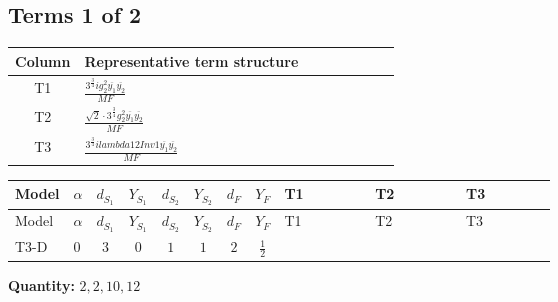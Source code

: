 \documentclass[8pt]{article}
\begin{document}
\begin{landscape}
\subsection*{Terms 1 of 2}
\begin{center}
\begin{tabular}{@{}c >{\raggedright\arraybackslash}p{0.82\linewidth}@{}}
\toprule
Column & Representative term structure \\
\midrule
T1 & \(\displaystyle \frac{3^{\frac{3}{4}} i g_{2}^{2} \overline{y_{1}} \overline{y_{2}}}{MF}\) \\
\midrule
T2 & \(\displaystyle \frac{\sqrt{2} \cdot 3^{\frac{3}{4}} g_{2}^{2} \overline{y_{1}} \overline{y_{2}}}{MF}\) \\
\midrule
T3 & \(\displaystyle \frac{3^{\frac{3}{4}} i lambda12Inv1 \overline{y_{1}} \overline{y_{2}}}{MF}\) \\
\midrule
\bottomrule
\end{tabular}
\end{center}
\smallskip
\tiny
\begin{longtable}{@{}llcccccc >{\raggedright\arraybackslash}p{0.21\linewidth} >{\raggedright\arraybackslash}p{0.21\linewidth} >{\raggedright\arraybackslash}p{0.21\linewidth}@{}}
\toprule
Model & $\alpha$ & $d_{S_1}$ & $Y_{S_1}$ & $d_{S_2}$ & $Y_{S_2}$ & $d_F$ & $Y_F$ & T1 & T2 & T3 \\
\midrule
\endfirsthead
\toprule
Model & $\alpha$ & $d_{S_1}$ & $Y_{S_1}$ & $d_{S_2}$ & $Y_{S_2}$ & $d_F$ & $Y_F$ & T1 & T2 & T3 \\
\midrule
\endhead
T3-D & $0$ & $3$ & $0$ & $1$ & $1$ & $2$ & $\frac{1}{2}$ & \scriptsize\adjustbox{max width=\linewidth}{$\begin{gathered} - \frac{17 \cdot 3^{\frac{3}{4}} i g_{2}^{2} \overline{y_{1}} \overline{y_{2}}}{24 MF}\end{gathered}$} & \scriptsize\adjustbox{max width=\linewidth}{$\begin{gathered} - \frac{\sqrt{2} \cdot 3^{\frac{3}{4}} g_{2}^{2} \overline{y_{1}} \overline{y_{2}}}{3 MF}\end{gathered}$} & \scriptsize\adjustbox{max width=\linewidth}{$\begin{gathered} - \frac{3^{\frac{3}{4}} i lambda12Inv1 \overline{y_{1}} \overline{y_{2}}}{6 MF}\end{gathered}$} \\
\midrule
\bottomrule
\end{longtable}
\clearpage
\noindent\textbf{Quantity: }$\mathrm{2,2,10,12}$\par\smallskip

\end{landscape}
\end{document}
